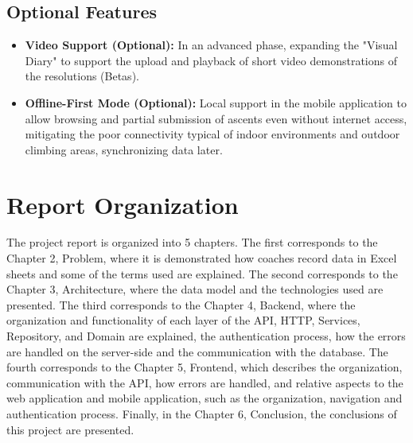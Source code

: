 
%
%
\subsection{Optional Features} \label{sec123}
\begin{itemize}
\item \textbf{Video Support (Optional):} In an advanced phase, expanding the "Visual Diary" to support the upload and playback of short video demonstrations of the resolutions (Betas).
\item \textbf{Offline-First Mode (Optional):} Local support in the mobile application to allow browsing and partial submission of ascents even without internet access, mitigating the poor connectivity typical of indoor environments and outdoor climbing areas, synchronizing data later.
\end{itemize}


%
%
\section{Report Organization} \label{sec13}
\begin{itemize}
The project report is organized into 5 chapters. The first corresponds to the Chapter 2,
Problem, where it is demonstrated how coaches record data in Excel sheets and some of the
terms used are explained. The second corresponds to the Chapter 3, Architecture, where the
data model and the technologies used are presented. The third corresponds to the Chapter 4,
Backend, where the organization and functionality of each layer of the API, HTTP, Services,
Repository, and Domain are explained, the authentication process, how the errors are handled
on the server-side and the communication with the database. The fourth corresponds to
the Chapter 5, Frontend, which describes the organization, communication with the API,
how errors are handled, and relative aspects to the web application and mobile application,
such as the organization, navigation and authentication process. Finally, in the Chapter 6,
Conclusion, the conclusions of this project are presented.
\end{itemize}

